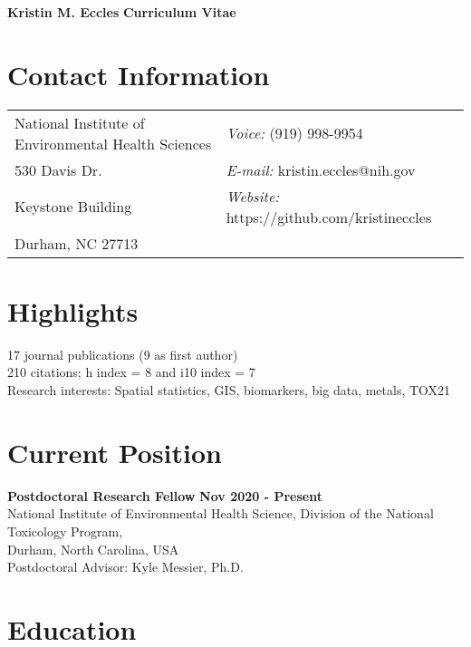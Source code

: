 \documentclass[margin,line]{res}
\begin{document}
\begin{flushleft}
		\huge \textbf{Kristin M. Eccles}
		\hfill {\LARGE \textbf{Curriculum Vitae}}\\
\end{flushleft}


\begin{resume}
\section{\sc Contact Information}
\vspace{.05in}
\begin{tabular}{@{}p{3.5in}p{2.5in}}
National Institute of Environmental Health Sciences  & {\it Voice:}  (919) 998-9954 \\
530 Davis Dr. &   {\it E-mail:}  kristin.eccles@nih.gov\\
Keystone Building  &    {\it Website:} https://github.com/kristineccles  \\
Durham, NC 27713

\end{tabular}

\vspace*{.1in}
\section{\sc Highlights}
17 journal publications (9 as first author)
\\
210 citations; h index = 8 and i10 index = 7
\\
Research interests: Spatial statistics, GIS, biomarkers, big data, metals, TOX21

\vspace*{.1in}
\section{\sc Current Position}
{\bf  Postdoctoral Research Fellow} \hfill {\bf Nov 2020 - Present}\\
National Institute of Environmental Health Science, Division of the National Toxicology Program,\\
Durham, North Carolina, USA\\
Postdoctoral Advisor: Kyle Messier, Ph.D.

\vspace*{.1in}
\section{\sc Education}


\end{resume}
\end{document}
